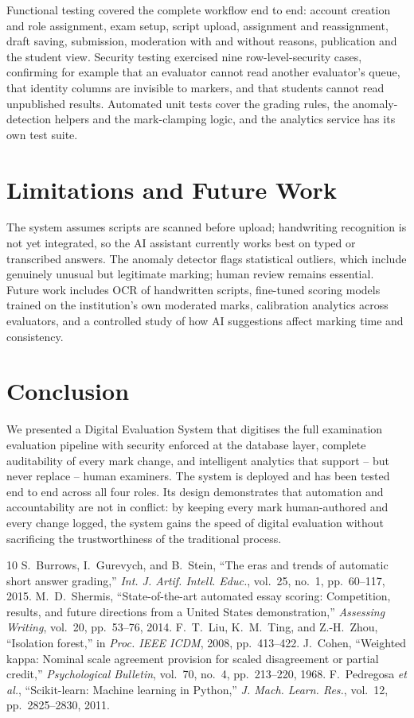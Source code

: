 \documentclass[conference]{IEEEtran}
\begin{document}
Functional testing covered the complete workflow end to end: account creation and role assignment, exam setup, script upload, assignment and reassignment, draft saving, submission, moderation with and without reasons, publication and the student view. Security testing exercised nine row-level-security cases, confirming for example that an evaluator cannot read another evaluator's queue, that identity columns are invisible to markers, and that students cannot read unpublished results. Automated unit tests cover the grading rules, the anomaly-detection helpers and the mark-clamping logic, and the analytics service has its own test suite.

\section{Limitations and Future Work}
The system assumes scripts are scanned before upload; handwriting recognition is not yet integrated, so the AI assistant currently works best on typed or transcribed answers. The anomaly detector flags statistical outliers, which include genuinely unusual but legitimate marking; human review remains essential. Future work includes OCR of handwritten scripts, fine-tuned scoring models trained on the institution's own moderated marks, calibration analytics across evaluators, and a controlled study of how AI suggestions affect marking time and consistency.

\section{Conclusion}
We presented a Digital Evaluation System that digitises the full examination evaluation pipeline with security enforced at the database layer, complete auditability of every mark change, and intelligent analytics that support -- but never replace -- human examiners. The system is deployed and has been tested end to end across all four roles. Its design demonstrates that automation and accountability are not in conflict: by keeping every mark human-authored and every change logged, the system gains the speed of digital evaluation without sacrificing the trustworthiness of the traditional process.

\begin{thebibliography}{10}
 S.~Burrows, I.~Gurevych, and B.~Stein, ``The eras and trends of automatic short answer grading,'' \emph{Int. J. Artif. Intell. Educ.}, vol.~25, no.~1, pp.~60--117, 2015.
 M.~D.~Shermis, ``State-of-the-art automated essay scoring: Competition, results, and future directions from a United States demonstration,'' \emph{Assessing Writing}, vol.~20, pp.~53--76, 2014.
 F.~T.~Liu, K.~M.~Ting, and Z.-H.~Zhou, ``Isolation forest,'' in \emph{Proc. IEEE ICDM}, 2008, pp.~413--422.
 J.~Cohen, ``Weighted kappa: Nominal scale agreement provision for scaled disagreement or partial credit,'' \emph{Psychological Bulletin}, vol.~70, no.~4, pp.~213--220, 1968.
 F.~Pedregosa \emph{et al.}, ``Scikit-learn: Machine learning in Python,'' \emph{J. Mach. Learn. Res.}, vol.~12, pp.~2825--2830, 2011.
\end{thebibliography}
\end{document}
